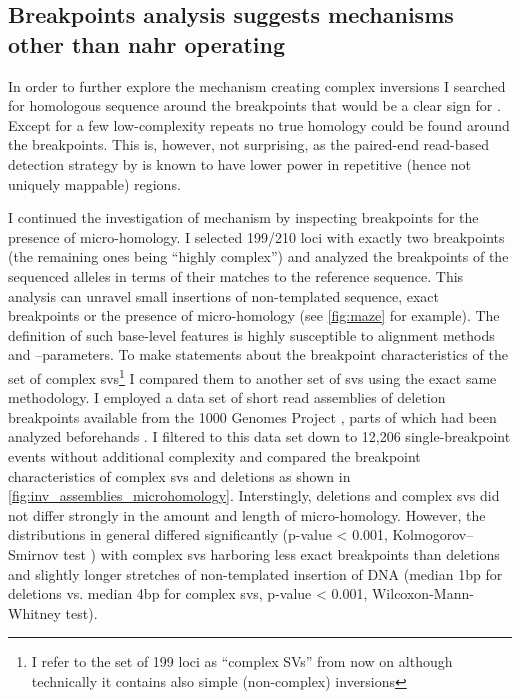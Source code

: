 \subsection{Breakpoints analysis suggests mechanisms other than \texorpdfstring{\acs{nahr}}{NAHR} operating}

In order to further explore the mechanism creating complex inversions I searched
for homologous sequence around the breakpoints that would be a clear sign for
\nahr. Except for a few low-complexity repeats no true homology could be found
around the breakpoints. This is, however, not surprising, as the paired-end
read-based detection strategy by \delly is known to have lower power in
repetitive (hence not uniquely mappable) regions.

I continued the investigation of mechanism by inspecting breakpoints for the
presence of micro-homology. I selected 199/210 loci with exactly two breakpoints
(the remaining ones being ``highly complex'') and analyzed the breakpoints of
the sequenced alleles in terms of their matches to the reference sequence. This
analysis can unravel small insertions of non-templated sequence, exact
breakpoints or the presence of micro-homology (see \cref{fig:maze} for example).
The definition of such base-level features is highly susceptible to alignment
methods and –parameters. To make statements about the breakpoint characteristics
of the set of complex \acp{sv}\footnote{I refer to the set of 199 loci as
``complex SVs'' from now on although technically it contains also simple
(non-complex) inversions} I compared them to another set of \acp{sv} using the
exact same methodology. I employed a data set of short read assemblies of
deletion breakpoints available from the 1000 Genomes Project \citep{Sudmant2015},
parts of which had been analyzed beforehands \citep{Abyzov2015}. I filtered to
this data set down to 12,206 single-breakpoint events without additional
complexity and compared the breakpoint characteristics of complex \acp{sv} and
deletions as shown in \cref{fig:inv_assemblies_microhomology}. Interstingly,
deletions and complex \acp{sv} did not differ strongly in the amount and length
of micro-homology. However, the distributions in general differed significantly
(p-value < 0.001, Kolmogorov–Smirnov test ) with complex \acp{sv} harboring less
exact breakpoints than deletions and slightly longer stretches of non-templated
insertion of DNA (median 1bp for deletions vs. median 4bp for complex \acp{sv},
p-value < 0.001, Wilcoxon-Mann-Whitney test).

